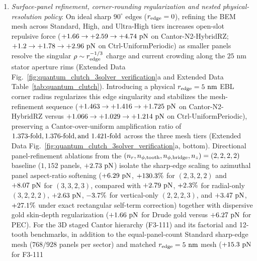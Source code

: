 \documentclass[pdflatex,sn-nature]{sn-jnl}
\DeclareRobustCommand{\roundtwo}[1]{\fpeval{round(#1,2)}}
\DeclareRobustCommand{\roundthree}[1]{\fpeval{round(#1,3)}}
\begin{document}
\begin{enumerate}
    \item \emph{Surface-panel refinement, corner-rounding regularization and nested physical-resolution policy}: On ideal sharp $90^\circ$ edges ($r_{\rm edge} = 0$), refining the BEM mesh across Standard, High, and Ultra-High tiers increases open-slot repulsive force ($+\roundtwo{\CantorNtwoHybridrzBemStdFZPn} \to +\roundtwo{\CantorNtwoHybridrzBemHighFZPn} \to +\roundtwo{\CantorNtwoHybridrzBemUltraFZPn}\text{ pN}$ on Cantor-N2-HybridRZ; $+\roundtwo{\CtrlUniformperiodicBemThetathreeFZPn} \to +\roundtwo{\CtrlUniformperiodicBemHighThetathreeFZPn} \to +\roundtwo{\CtrlUniformperiodicBemUltraThetathreeFZPn}\text{ pN}$ on Ctrl-UniformPeriodic) as smaller panels resolve the singular $\rho \sim r_{\rm edge}^{-1/3}$ charge and current crowding along the $25\text{ nm}$ stator aperture rims (Extended Data Fig.~\ref{fig:quantum_clutch_3solver_verification}a and Extended Data Table~\ref{tab:quantum_clutch}). Introducing a physical $r_{\rm edge} = 5\text{ nm}$ EBL corner radius regularizes this edge singularity and stabilizes the mesh-refinement sequence ($+\roundthree{\CantorNtwoHybridrzBemRfiveNmStdFZPn} \to +\roundthree{\CantorNtwoHybridrzBemRfiveNmHighFZPn} \to +\roundthree{\CantorNtwoHybridrzBemRfiveNmUltraFZPn}\text{ pN}$ on Cantor-N2-HybridRZ versus $+\roundthree{\CtrlUniformperiodicBemRfiveNmStdFZPn} \to +\roundthree{\CtrlUniformperiodicBemRfiveNmHighFZPn} \to +\roundthree{\CtrlUniformperiodicBemRfiveNmUltraFZPn}\text{ pN}$ on Ctrl-UniformPeriodic), preserving a Cantor-over-uniform amplification ratio of $\roundthree{\fpeval{\CantorNtwoHybridrzBemRfiveNmStdFZPn/\CtrlUniformperiodicBemRfiveNmStdFZPn}}\text{-fold}, \roundthree{\fpeval{\CantorNtwoHybridrzBemRfiveNmHighFZPn/\CtrlUniformperiodicBemRfiveNmHighFZPn}}\text{-fold}, \text{and } \roundthree{\fpeval{\CantorNtwoHybridrzBemRfiveNmUltraFZPn/\CtrlUniformperiodicBemRfiveNmUltraFZPn}}\text{-fold}$ across the three mesh tiers (Extended Data Fig.~\ref{fig:quantum_clutch_3solver_verification}a, bottom). Directional panel-refinement ablations from the $(n_r, n_{\phi,\rm tooth}, n_{\phi,\rm bridge}, n_z) = (2,2,2,2)$ baseline ($1{,}152$ panels, $+\roundtwo{\BemConvDirBaseFzPn}\text{ pN}$) isolate the sharp-edge scaling to azimuthal panel aspect-ratio softening ($+\roundtwo{\BemConvDirAzimuthalFzPn}\text{ pN}$, $+130.3{}\%$ for $(2,3,2,2)$ and $+\roundtwo{\BemConvDirHighFzPn}\text{ pN}$ for $(3,3,2,3)$, compared with $+\roundtwo{\BemConvDirRadialFzPn}\text{ pN}$, $+2.3{}\%$ for radial-only $(3,2,2,2)$, $+\roundtwo{\BemConvDirVerticalFzPn}\text{ pN}$, $-3.7{}\%$ for vertical-only $(2,2,2,3)$, and $+\roundtwo{\BemConvDirRectSelfFzPn}\text{ pN}$, $+27.1{}\%$ under exact rectangular self-term correction) together with dispersive gold skin-depth regularization ($+\roundtwo{\CantorNtwoHybridrzBemStdFZPn}\text{ pN}$ for Drude gold versus $+\roundtwo{\BemConvStdNxitwofourPecFzPn}\text{ pN}$ for PEC). For the 3D staged Cantor hierarchy (F3-111) and its factorial and 12-tooth benchmarks, in addition to the equal-panel-count Standard sharp-edge mesh ($768/928$ panels per sector) and matched $r_{\rm edge}=5\text{ nm}$ mesh ($+\roundtwo{\NthreeUnithreedFoneoneoneRfivenmFzPn}\text{ pN}$ for F3-111 
\end{enumerate}
\end{document}
